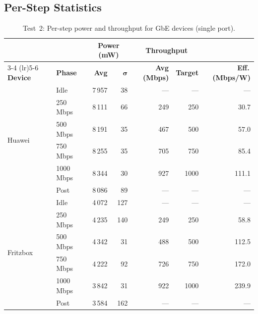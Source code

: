 \subsection{Per-Step Statistics}
\label{sec:test2-per-step-stats}

\begin{table}[H]
    \centering
    \caption{Test~2: Per-step power and throughput for \ac{GbE} devices (single port).}
    \label{tab:test2_gbe_stats}
    \footnotesize\renewcommand{\arraystretch}{0.88}\setlength{\tabcolsep}{4pt}
    \begin{tabular}{l l r r r r r}
        \toprule
        & & \multicolumn{2}{c}{\textbf{Power (mW)}} & \multicolumn{2}{c}{\textbf{Throughput}} & \\
        \cmidrule(lr){3-4} \cmidrule(lr){5-6}
        \textbf{Device} & \textbf{Phase} & \textbf{Avg} & $\boldsymbol{\sigma}$ & \textbf{Avg (Mbps)} & \textbf{Target} & \textbf{Eff.\,(Mbps/W)} \\
        \midrule
        \multirow{6}{*}{Huawei}
            & Idle           & 7\,957 & 38  & ---   & ---   & ---  \\
            & 250\,Mbps      & 8\,111 & 66  & 249   & 250   & 30.7 \\
            & 500\,Mbps      & 8\,191 & 35  & 467   & 500   & 57.0 \\
            & 750\,Mbps      & 8\,255 & 35  & 705   & 750   & 85.4 \\
            & 1000\,Mbps     & 8\,344 & 30  & 927   & 1000  & 111.1 \\
            & Post           & 8\,086 & 89  & ---   & ---   & ---  \\
        \midrule
        \multirow{6}{*}{Fritzbox}
            & Idle           & 4\,072 & 127 & ---   & ---   & ---  \\
            & 250\,Mbps      & 4\,235 & 140 & 249   & 250   & 58.8 \\
            & 500\,Mbps      & 4\,342 & 31  & 488   & 500   & 112.5 \\
            & 750\,Mbps      & 4\,222 & 92  & 726   & 750   & 172.0 \\
            & 1000\,Mbps     & 3\,842 & 31  & 922   & 1000  & 239.9 \\
            & Post           & 3\,584 & 162 & ---   & ---   & ---  \\
        \midrule

\end{tabular}
\end{table}
